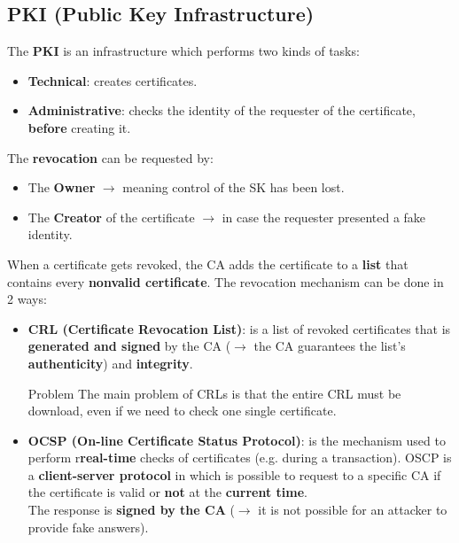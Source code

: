 \subsection{PKI (Public Key Infrastructure)}
The \textbf{PKI} is an infrastructure which performs two kinds of tasks:
\begin{itemize}
    \item \textbf{Technical}: creates certificates.
    \item \textbf{Administrative}: checks the identity of the requester of the certificate, \textbf{before} creating it.
 
\end{itemize}
The \textbf{revocation} can be requested by:
\begin{itemize}
    \item The \textbf{Owner}  \(\rightarrow \) meaning control of the SK has been lost.
    \item The \textbf{Creator} of the certificate \(\rightarrow \) in case the requester presented a fake identity. 
\end{itemize}
When a certificate gets revoked, the CA adds the certificate to a \textbf{list} that contains every \textbf{nonvalid certificate}. The revocation mechanism can be done in 2 ways:
\begin{itemize}
    \item \textbf{CRL (Certificate Revocation List)}: is a list of revoked certificates that is \textbf{generated and signed} by the CA (\(\rightarrow \) the CA guarantees the list's \textbf{authenticity}) and \textbf{integrity}.
    \begin{quotebox-red}{Problem}
        The main problem of CRLs is that the entire CRL must be download, even if we need to check one single certificate.
    \end{quotebox-red}
    \item \textbf{OCSP (On-line Certificate Status Protocol)}: is the mechanism used to perform r\textbf{real-time} checks of certificates (e.g. during
    a transaction). OSCP is a \textbf{client-server protocol} in which is possible to request to a
    specific CA if the certificate is valid or \textbf{not} at the \textbf{current time}.\\
    The response is \textbf{signed by the CA} (\(\rightarrow \) it is not possible for an attacker to provide
    fake answers).
\end{itemize}

